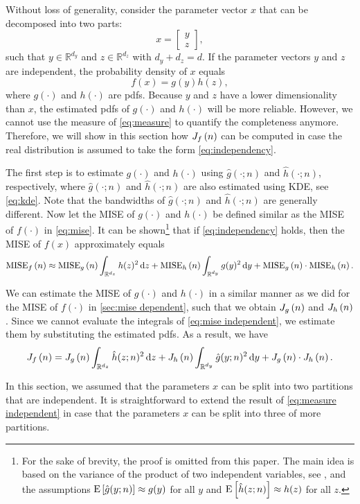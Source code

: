 Without loss of generality, consider the parameter vector $x$ that can be decomposed into two parts:
\begin{equation}
	\label{eq:combine}
	x = \begin{bmatrix}
		y \\ z
	\end{bmatrix},
\end{equation}
such that $y \in \mathbb{R}^{d_y}$ and $z \in \mathbb{R}^{d_z}$ with $d_y+d_z=d$. If the parameter vectors $y$ and $z$ are independent, the probability density of $x$ equals
\begin{equation}
	\label{eq:independency}
	f(x) = g(y) h(z),
\end{equation}
where $g(\cdot)$ and $h(\cdot)$ are pdfs.
Because $y$ and $z$ have a lower dimensionality than $x$, the estimated pdfs of $g(\cdot)$ and $h(\cdot)$ will be more reliable. However, we cannot use the measure of \cref{eq:measure} to quantify the completeness anymore. Therefore, we will show in this section how $J_{f} \left( n \right)$ can be computed in case the real distribution is assumed to take the form \cref{eq:independency}.

The first step is to estimate $g(\cdot)$ and $h(\cdot)$ using $\hat{g}(\cdot;n)$ and $\hat{h}(\cdot;n)$, respectively, where $\hat{g}(\cdot;n)$ and $\hat{h}(\cdot;n)$ are also estimated using KDE, see \cref{eq:kde}. Note that the bandwidths of $\hat{g}(\cdot;n)$ and $\hat{h}(\cdot;n)$ are generally different. Now let the MISE of $g(\cdot)$ and $h(\cdot)$ be defined similar as the MISE of $f(\cdot)$ in \cref{eq:mise}. It can be shown\footnote{For the sake of brevity, the proof is omitted from this paper. The main idea is based on the variance of the product of two independent variables, see \textcite{goodman1960exact}, and the assumptions $\textup{E} \left[ \hat{g}(y;n) \right] \approx g(y)$ for all $y$ and $\textup{E} \left[ \hat{h}(z;n) \right] \approx h(z)$ for all $z$.} that if \cref{eq:independency} holds, then the MISE of $f(x)$ approximately equals
\begin{dmath}
	\label{eq:mise independent}
	\mise{f}{n} \approx \mise{g}{n} \int_{\mathbb{R}^{d_z}} h(z)^2 \ud z + \mise{h}{n} \int_{\mathbb{R}^{d_y}} g(y)^2 \ud y + \mise{g}{n} \cdot \mise{h}{n}.
\end{dmath}

We can estimate the MISE of $g(\cdot)$ and $h(\cdot)$ in a similar manner as we did for the MISE of $f(\cdot)$ in \cref{sec:mise dependent}, such that we obtain $J_{g} \left( n \right)$ and $J_{h} \left( n \right)$. Since we cannot evaluate the integrals of \cref{eq:mise independent}, we estimate them by substituting the estimated pdfs. As a result, we have
\begin{dmath}
	\label{eq:measure independent}
	\measure{f}{n} = \measure{g}{n} \int_{\mathbb{R}^{d_z}} \hat{h}(z;n)^2 \ud z + \measure{h}{n} \int_{\mathbb{R}^{d_y}} \hat{g}(y;n)^2 \ud y + \measure{g}{n} \cdot \measure{h}{n}.
\end{dmath}

In this section, we assumed that the parameters $x$ can be split into two partitions that are independent. It is straightforward to extend the result of \cref{eq:measure independent} in case that the parameters $x$ can be split into three of more partitions. 

